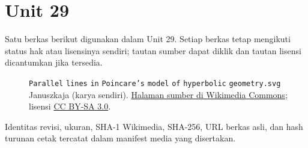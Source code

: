 \section*{Unit 29}
Satu berkas berikut digunakan dalam Unit 29. Setiap berkas tetap mengikuti status hak atau lisensinya sendiri; tautan sumber dapat diklik dan tautan lisensi dicantumkan jika tersedia.
\begin{description}
\item[]\texttt{Parallel} \texttt{lines} \texttt{in} \texttt{Poincare's} \texttt{model} \texttt{of} \texttt{hyperbolic} \texttt{geometry.svg}
Januszkaja (karya sendiri).
\href{https://commons.wikimedia.org/wiki/File:Parallel_lines_in_Poincare%27s_model_of_hyperbolic_geometry.svg}{Halaman sumber di Wikimedia Commons}; lisensi \href{https://creativecommons.org/licenses/by-sa/3.0/}{CC BY-SA 3.0}.
\end{description}
Identitas revisi, ukuran, SHA-1 Wikimedia, SHA-256, URL berkas asli, dan hash turunan cetak tercatat dalam manifest media yang disertakan.

